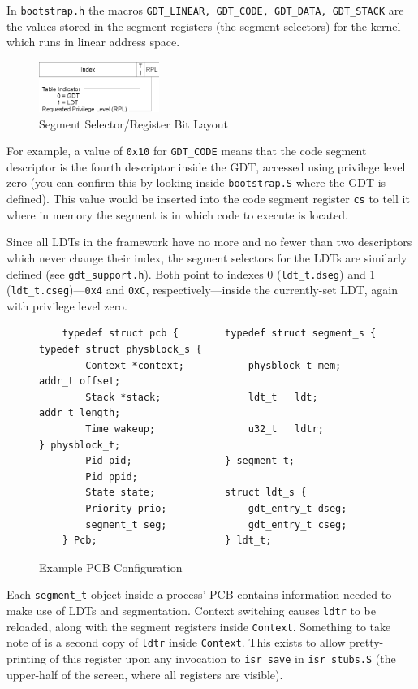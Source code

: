 \documentclass[titlepage]{article}
\begin{document}
In \verb|bootstrap.h| the macros
\verb|GDT_LINEAR, GDT_CODE, GDT_DATA, GDT_STACK| are the values stored in the
segment registers (the segment selectors) for the kernel which runs in linear
address space.

\begin{figure}[!ht]
    \centering
    \includegraphics[width=0.35\textwidth]{images/segment_selector.eps}
    \caption{Segment Selector/Register Bit Layout}
\end{figure}

For example, a value of \verb|0x10| for \verb|GDT_CODE| means that the code
segment descriptor is the fourth descriptor inside the GDT, accessed using
privilege level zero (you can confirm this by looking inside \verb|bootstrap.S|
where the GDT is defined). This value would be inserted into the code segment
register \verb|cs| to tell it where in memory the segment is in which code to
execute is located.

Since all LDTs in the framework have no more and no fewer than two descriptors
which never change their index, the segment selectors for the LDTs are similarly
defined (see \verb|gdt_support.h|). Both point to indexes 0 (\verb|ldt_t.dseg|)
and 1 (\verb|ldt_t.cseg|)---\verb|0x4| and \verb|0xC|, respectively---inside the
currently-set LDT, again with privilege level zero.

\begin{figure}[!ht]
\begin{verbatim}
    typedef struct pcb {        typedef struct segment_s {  typedef struct physblock_s {
        Context *context;           physblock_t mem;            addr_t offset;
        Stack *stack;               ldt_t   ldt;                addr_t length;
        Time wakeup;                u32_t   ldtr;           } physblock_t;
        Pid pid;                } segment_t;
        Pid ppid;
        State state;            struct ldt_s {
        Priority prio;              gdt_entry_t dseg;
        segment_t seg;              gdt_entry_t cseg;
    } Pcb;                      } ldt_t;
\end{verbatim}
\caption{Example PCB Configuration}
\end{figure}

Each \verb|segment_t| object inside a process' PCB contains information
needed to make use of LDTs and segmentation. Context switching causes
\verb|ldtr| to be reloaded, along with the segment registers inside
\verb|Context|. Something to take note of is a second copy of \verb|ldtr| inside
\verb|Context|. This exists to allow pretty-printing of this register upon any
invocation to \verb|isr_save| in \verb|isr_stubs.S| (the upper-half of the
screen, where all registers are visible).
\end{document}
